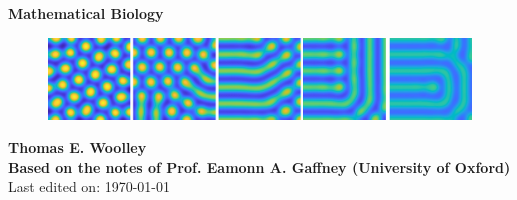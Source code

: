 \documentclass[oneside]{book}
\begin{document}
{\centering
    \vfill
{\bfseries\Huge
        Mathematical Biology\\
        \vskip2cm    }    
\begin{figure}[!!!h!!!tb]
\centering
\includegraphics[width=\textwidth]{../Pictures/Spots_to_stripes_2.png}
\end{figure}
\vskip2cm    
{\bfseries\LARGE
         Thomas E. Woolley\\       
    }
    \vskip2cm    
{\bfseries\large
         Based on the notes of Prof. Eamonn A. Gaffney (University of Oxford)\\       
    }
    \vfill
    Last edited on: \today }

{\let\cleardoublepage\clearpage 
\tableofcontents
} 









\end{document}
